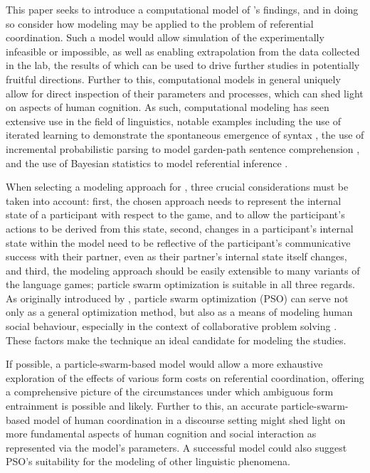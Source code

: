 \documentclass[12pt,a4paper]{article}
\begin{document}
This paper seeks to introduce a computational model of \citeauthor{rohde2012}'s findings, and in doing so consider how modeling may be applied to the problem of referential coordination. Such a model would allow simulation of the experimentally infeasible or impossible, as well as enabling extrapolation from the data collected in the lab, the results of which can be used to drive further studies in potentially fruitful directions. Further to this, computational models in general uniquely allow for direct inspection of their parameters and processes, which can shed light on aspects of human cognition. As such, computational modeling has seen extensive use in the field of linguistics, notable examples including the use of iterated learning to demonstrate the spontaneous emergence of syntax \citep{kirby2002}, the use of incremental probabilistic parsing to model garden-path sentence comprehension \citep{hale2001}, and the use of Bayesian statistics to model referential inference \citep{frank2012}.

When selecting a modeling approach for \cite{rohde2012}, three crucial considerations must be taken into account: first, the chosen approach needs to represent the internal state of a participant with respect to the game, and to allow the participant's actions to be derived from this state, second, changes in a participant's internal state within the model need to be reflective of the participant's communicative success with their partner, even as their partner's internal state itself changes, and third, the modeling approach should be easily extensible to many variants of the \citeauthor{rohde2012} language games; particle swarm optimization is suitable in all three regards. As originally introduced by \citet*{kennedy1995}, particle swarm optimization (PSO) can serve not only as a general optimization method, but also as a means of modeling human social behaviour, especially in the context of collaborative problem solving \citep{kennedy1997}. These factors make the technique an ideal candidate for modeling the \citeauthor{rohde2012} studies. 

If possible, a particle-swarm-based model would allow a more exhaustive exploration of the effects of various form costs on referential coordination, offering a comprehensive picture of the circumstances under which ambiguous form entrainment is possible and likely. Further to this, an accurate particle-swarm-based model of human coordination in a discourse setting might shed light on more fundamental aspects of human cognition and social interaction as represented via the model's parameters. A successful model could also suggest PSO's suitability for the modeling of other linguistic phenomena. 
\end{document}
